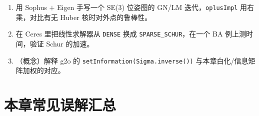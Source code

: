 \begin{practice}
\begin{enumerate}
  \item 用 Sophus $+$ Eigen 手写一个 SE(3) 位姿图的 GN/LM 迭代，\texttt{oplusImpl} 用右乘，对比有无 Huber 核时对外点的鲁棒性。
  \item 在 Ceres 里把线性求解器从 \texttt{DENSE} 换成 \texttt{SPARSE\_SCHUR}，在一个 BA 例上测时间，验证 Schur 的加速。
  \item （概念）解释 g2o 的 \texttt{setInformation(Sigma.\allowbreak inverse())} 与本章白化/信息矩阵加权的对应。
\end{enumerate}
\end{practice}

\section*{本章常见误解汇总}
